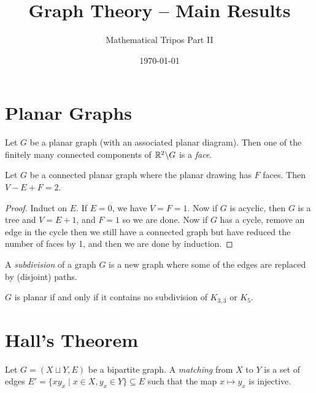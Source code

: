\documentclass[a3paper, 10pt]{article}
\title{Graph Theory -- Main Results}
\author{Mathematical Tripos Part II}
\date{\today}
\renewcommand{\vocab}[1]{\emph{#1}}
\begin{document}
\begin{multicols*}{5}

\maketitle


\section{Planar Graphs}

\begin{definition}[Face]
    Let $G$ be a planar graph (with an associated planar diagram). Then one of the finitely many connected components of $\mathbb{R}^2 \backslash G$ is a \vocab{face}.
\end{definition}

\begin{theorem}[Euler]
    Let $G$ be a connected planar graph where the planar drawing has $F$ faces. Then $V - E + F = 2$.
\end{theorem}
\begin{proof}
    Induct on $E$. If $E= 0$, we have $V =F = 1$. Now if $G$ is acyclic, then $G$ is a tree and $V = E + 1$, and $F = 1$ so we are done. Now if $G$ has a cycle, remove an edge in the cycle then we still have a connected graph but have reduced the number of faces by 1, and then we are done by induction.
\end{proof}

\begin{definition}[Subdivision]
    A \vocab{subdivision} of a graph $G$ is a new graph where some of the edges are replaced by (disjoint) paths.
\end{definition}

\begin{theorem}[Kuratowski]
    $G$ is planar if and only if it contains no subdivision of $K_{3, 3}$ or $K_5$.
\end{theorem}

\section{Hall's Theorem}

\begin{definition}[Matching]
    Let $G = (X \sqcup Y, E)$ be a bipartite graph. A \vocab{matching} from $X$ to $Y$ is a set of edges $E' = \{x y_x \mid x \in X, y_x \in Y\} \subseteq E$ such that the map $x \mapsto y_x$ is injective.
\end{definition}


\end{multicols*}
\end{document}
